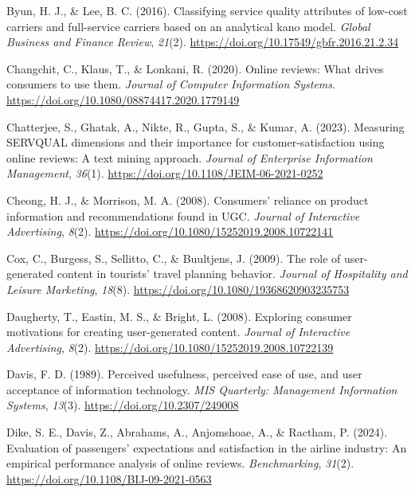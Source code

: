 \documentclass[
]{agujournal2019}
\newlength{\cslhangindent}
\newenvironment{CSLReferences}[2] %
 {\begin{list}{}{%
  \setlength{\itemindent}{0pt}
  \setlength{\leftmargin}{0pt}
  \setlength{\parsep}{0pt}
  \ifodd #1
   \setlength{\leftmargin}{\cslhangindent}
   \setlength{\itemindent}{-1\cslhangindent}
  \fi
  \setlength{\itemsep}{#2\baselineskip}}}
 {\end{list}}
\begin{document}
\begin{CSLReferences}{1}{0}
Byun, H. J., \& Lee, B. C. (2016). Classifying service quality
attributes of low-cost carriers and full-service carriers based on an
analytical kano model. \emph{Global Business and Finance Review},
\emph{21}(2). \url{https://doi.org/10.17549/gbfr.2016.21.2.34}

Changchit, C., Klaus, T., \& Lonkani, R. (2020). Online reviews: What
drives consumers to use them. \emph{Journal of Computer Information
Systems}. \url{https://doi.org/10.1080/08874417.2020.1779149}

Chatterjee, S., Ghatak, A., Nikte, R., Gupta, S., \& Kumar, A. (2023).
Measuring SERVQUAL dimensions and their importance for
customer-satisfaction using online reviews: A text mining approach.
\emph{Journal of Enterprise Information Management}, \emph{36}(1).
\url{https://doi.org/10.1108/JEIM-06-2021-0252}

Cheong, H. J., \& Morrison, M. A. (2008). Consumers' reliance on product
information and recommendations found in UGC. \emph{Journal of
Interactive Advertising}, \emph{8}(2).
\url{https://doi.org/10.1080/15252019.2008.10722141}

Cox, C., Burgess, S., Sellitto, C., \& Buultjens, J. (2009). The role of
user-generated content in tourists' travel planning behavior.
\emph{Journal of Hospitality and Leisure Marketing}, \emph{18}(8).
\url{https://doi.org/10.1080/19368620903235753}

Daugherty, T., Eastin, M. S., \& Bright, L. (2008). Exploring consumer
motivations for creating user-generated content. \emph{Journal of
Interactive Advertising}, \emph{8}(2).
\url{https://doi.org/10.1080/15252019.2008.10722139}

Davis, F. D. (1989). Perceived usefulness, perceived ease of use, and
user acceptance of information technology. \emph{MIS Quarterly:
Management Information Systems}, \emph{13}(3).
\url{https://doi.org/10.2307/249008}

Dike, S. E., Davis, Z., Abrahams, A., Anjomshoae, A., \& Ractham, P.
(2024). Evaluation of passengers' expectations and satisfaction in the
airline industry: An empirical performance analysis of online reviews.
\emph{Benchmarking}, \emph{31}(2).
\url{https://doi.org/10.1108/BIJ-09-2021-0563}


\end{CSLReferences}
\end{document}
